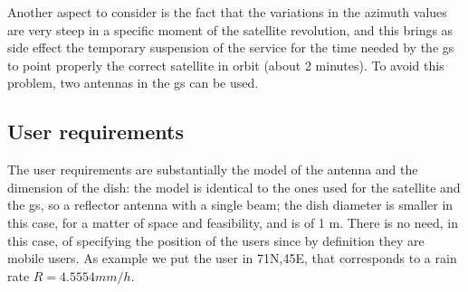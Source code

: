 	Another aspect to consider is the fact that the variations in the azimuth values are very steep in a specific moment of the satellite revolution, and this brings as side effect the temporary suspension of the service for the time needed by the \gls{gs} to point properly the correct satellite in orbit (about 2 minutes).
	To avoid this problem, two antennas in the \gls{gs} can be used.
\subsection{User requirements}
The user requirements are substantially the model of the antenna and the dimension of the dish: the model is identical to the ones used for the satellite and the \gls{gs}, so a reflector antenna with a single beam; the dish diameter is smaller in this case, for a matter of space and feasibility, and is of 1 m. There is no need, in this case, of specifying the position of the users since by definition they are mobile users. As example we put the user in 71N,45E, that corresponds to a rain rate $R = 4.5554 mm/h$.
